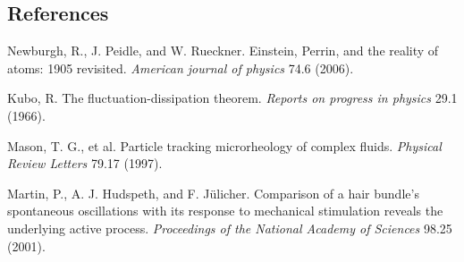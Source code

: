 \documentclass[a4paper]{tufte-handout}
\begin{document}
\subsection{References}
\label{sec:refernces}
\begin{fullwidth}
    \scriptsize
    Newburgh, R., J. Peidle, and W. Rueckner. 
    Einstein, Perrin, and the reality of atoms: 1905 revisited.
    \textit{American journal of physics} 74.6 (2006).
    \vspace{0.1cm}

    \noindent
    Kubo, R. 
    The fluctuation-dissipation theorem.
    \textit{Reports on progress in physics} 29.1 (1966).
    \vspace{0.1cm}

    \noindent
    Mason, T. G., et al.
    Particle tracking microrheology of complex fluids.
    \textit{Physical Review Letters} 79.17 (1997).
    \vspace{0.1cm}

    \noindent
    Martin, P., A. J. Hudspeth, and F. Jülicher. 
    Comparison of a hair bundle's spontaneous oscillations with its response to 
    mechanical stimulation reveals the underlying active process. 
    \textit{Proceedings of the National Academy of Sciences} 98.25 (2001).
\end{fullwidth}
\end{document}
